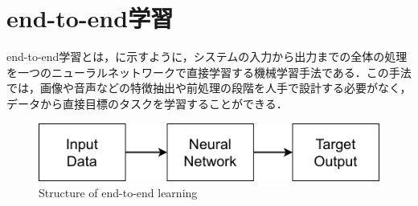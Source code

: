 
\section{end-to-end学習}

  end-to-end学習とは，に示すように，システムの入力から出力までの全体の処理を一つのニューラルネットワークで直接学習する機械学習手法である．この手法では，画像や音声などの特徴抽出や前処理の段階を人手で設計する必要がなく，データから直接目標のタスクを学習することができる．

  \vspace{3cm}

  \begin{figure}[h]
    \centering
    \includegraphics[keepaspectratio, scale=0.70] {images/RobotGuidance_about_end-to-end.png}
    \caption{Structure of end-to-end learning}
    \label{Fig:about_end-to-end}
  \end{figure}

\newpage
